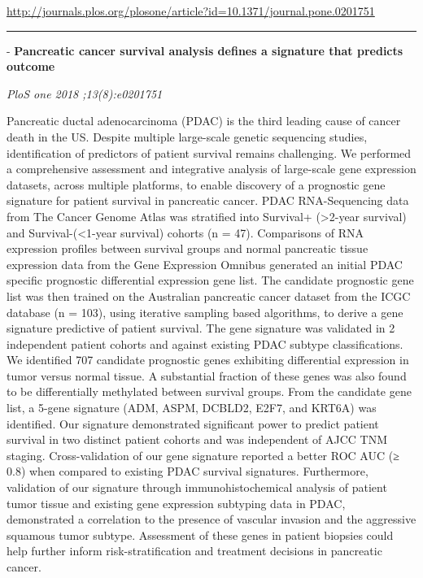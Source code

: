 \documentclass[]{article}
\begin{document}
\url{http://journals.plos.org/plosone/article?id=10.1371/journal.pone.0201751}

\begin{center}\rule{0.5\linewidth}{\linethickness}\end{center}

 - \textbf{Pancreatic cancer survival analysis defines a signature that
predicts outcome}

\emph{PloS one 2018 ;13(8):e0201751}

Pancreatic ductal adenocarcinoma (PDAC) is the third leading cause of
cancer death in the US. Despite multiple large-scale genetic sequencing
studies, identification of predictors of patient survival remains
challenging. We performed a comprehensive assessment and integrative
analysis of large-scale gene expression datasets, across multiple
platforms, to enable discovery of a prognostic gene signature for
patient survival in pancreatic cancer. PDAC RNA-Sequencing data from The
Cancer Genome Atlas was stratified into Survival+ (\textgreater{}2-year
survival) and Survival-(\textless{}1-year survival) cohorts (n = 47).
Comparisons of RNA expression profiles between survival groups and
normal pancreatic tissue expression data from the Gene Expression
Omnibus generated an initial PDAC specific prognostic differential
expression gene list. The candidate prognostic gene list was then
trained on the Australian pancreatic cancer dataset from the ICGC
database (n = 103), using iterative sampling based algorithms, to derive
a gene signature predictive of patient survival. The gene signature was
validated in 2 independent patient cohorts and against existing PDAC
subtype classifications. We identified 707 candidate prognostic genes
exhibiting differential expression in tumor versus normal tissue. A
substantial fraction of these genes was also found to be differentially
methylated between survival groups. From the candidate gene list, a
5-gene signature (ADM, ASPM, DCBLD2, E2F7, and KRT6A) was identified.
Our signature demonstrated significant power to predict patient survival
in two distinct patient cohorts and was independent of AJCC TNM staging.
Cross-validation of our gene signature reported a better ROC AUC (≥ 0.8)
when compared to existing PDAC survival signatures. Furthermore,
validation of our signature through immunohistochemical analysis of
patient tumor tissue and existing gene expression subtyping data in
PDAC, demonstrated a correlation to the presence of vascular invasion
and the aggressive squamous tumor subtype. Assessment of these genes in
patient biopsies could help further inform risk-stratification and
treatment decisions in pancreatic cancer.
\end{document}
